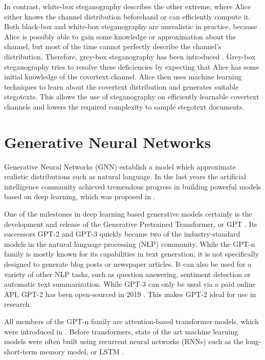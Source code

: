 In contrast, white-box steganography describes the other extreme, where Alice either knows the channel distribution beforehand or can efficiently compute it.
Both black-box and white-box steganography are unrealistic in practice, because Alice is possibly able to gain some knowledge or approximation about the channel, but most of the time cannot perfectly describe the channel's distribution.
Therefore, grey-box steganography has been introduced \cite{LRW2013}.
Grey-box steganography tries to resolve these deficiencies by expecting that Alice has some initial knowledge of the covertext channel.
Alice then uses machine learning techniques to learn about the covertext distribution and generates suitable stegotexts.
This allows the use of steganography on efficiently learnable covertext channels and lowers the required complexity to sample stegotext documents.

\section{Generative Neural Networks}
\label{sec:generative-neural-networks}

Generative Neural Networks (GNN) establish a model which approximate realistic distributions such as natural language.
In the last years the artificial intelligence community achieved tremendous progress in building powerful models based on deep learning, which was proposed in \cite{DeepLearning2015}.

One of the milestones in deep learning based generative models certainly is the development and release of the Generative Pretrained Transformer, or GPT \cite{OpenAI2018}.
Its successors GPT-2 \cite{OpenAI2019} and GPT-3 \cite{OpenAI2020} quickly became two of the industry-standard models in the natural language processing (NLP) community.
While the GPT-n family is mostly known for its capabilities in text generation, it is not specifically designed to generate blog posts or newspaper articles.
It can also be used for a variety of other NLP tasks, such as question answering, sentiment detection or automatic text summarization.
While GPT-3 can only be used via a paid online API, GPT-2 has been open-sourced in 2019 \cite{GPTReleasePlan2019}.
This makes GPT-2 ideal for use in research.

All members of the GPT-n family are attention-based transformer models, which were introduced in \cite{Vaswani2017}.
Before transformers, state of the art machine learning models were often built using recurrent neural networks (RNNs) such as the long-short-term memory model, or LSTM \cite{Hochreiter1997}.


